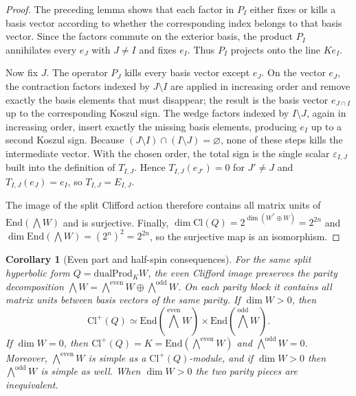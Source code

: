 \documentclass{birkjour}
\theoremstyle{plain}
\newtheorem{corollary}[theorem]{Corollary}
\theoremstyle{definition}
\theoremstyle{remark}
\newcommand{\Cl}{\mathrm{Cl}}
\newcommand{\End}{\mathrm{End}}
\newcommand{\dualProd}{\mathrm{dualProd}}
\newcommand{\wedgeEven}{\bigwedge^{\mathrm{even}} W}
\newcommand{\wedgeOdd}{\bigwedge^{\mathrm{odd}} W}
\begin{document}
\begin{proof}
The preceding lemma shows that each factor in $P_I$ either fixes or kills a
basis vector according to whether the corresponding index belongs to that basis
vector. Since the factors commute on the exterior basis, the product $P_I$
annihilates every $e_J$ with $J\neq I$ and fixes $e_I$. Thus $P_I$ projects
onto the line $Ke_I$.

Now fix $J$. The operator $P_J$ kills every basis vector except $e_J$. On the
vector $e_J$, the contraction factors indexed by $J\setminus I$ are applied in
increasing order and remove exactly the basis elements that must disappear; the
result is the basis vector $e_{J\cap I}$ up to the corresponding Koszul sign.
The wedge factors indexed by $I\setminus J$, again in increasing order, insert
exactly the missing basis elements, producing $e_I$ up to a second Koszul sign.
Because $(J\setminus I)\cap(I\setminus J)=\varnothing$, none of these steps
kills the intermediate vector. With the chosen order, the total sign is the
single scalar $\varepsilon_{I,J}$ built into the definition of $T_{I,J}$.
Hence $T_{I,J}(e_{J'})=0$ for $J'\neq J$ and $T_{I,J}(e_J)=e_I$, so
$T_{I,J}=E_{I,J}$.

The image of the split Clifford action therefore contains all matrix units of
$\End(\bigwedge W)$ and is surjective. Finally,
$\dim \Cl(Q)=2^{\dim(W^*\oplus W)}=2^{2n}$ and
$\dim \End(\bigwedge W)=(2^n)^2=2^{2n}$, so the surjective map is an
isomorphism.
\end{proof}

\begin{corollary}[Even part and half-spin consequences]
\label{cor:even-half-spin}
For the same split hyperbolic form $Q=\dualProd_K W$, the even Clifford image
preserves the parity decomposition
$\bigwedge W=\wedgeEven\oplus\wedgeOdd$. On each parity block it contains all
matrix units between basis vectors of the same parity. If $\dim W>0$, then
\[
  \Cl^+(Q)\simeq \End(\wedgeEven)\times \End(\wedgeOdd).
\]
If $\dim W=0$, then $\Cl^+(Q)=K=\End(\wedgeEven)$ and $\wedgeOdd=0$. Moreover,
$\wedgeEven$ is simple as a $\Cl^+(Q)$-module, and if $\dim W>0$ then
$\wedgeOdd$ is simple as well. When $\dim W>0$ the two parity pieces are
inequivalent.
\end{corollary}
\end{document}
